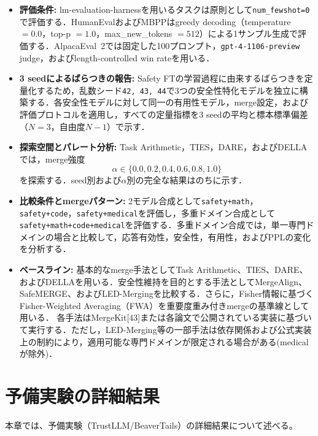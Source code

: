 \documentclass{article}
\begin{document}
\begin{itemize}
\begin{itemize}
        \item \textbf{評価条件:}
        lm-evaluation-harnessを用いるタスクは原則として\texttt{num\_fewshot=0}で評価する．HumanEvalおよびMBPPはgreedy decoding（temperature \(=0.0\)，top-p \(=1.0\)，max\_new\_tokens \(=512\)）による1サンプル生成で評価する．AlpacaEval~2では固定した100プロンプト，\texttt{gpt-4-1106-preview} judge，およびlength-controlled win rateを用いる．
        \item \textbf{3 seedによるばらつきの報告:}
        Safety FTの学習過程に由来するばらつきを定量化するため，乱数シード\texttt{42, 43, 44}で3つの安全性特化モデルを独立に構築する．各安全性モデルに対して同一の有用性モデル，merge設定，および評価プロトコルを適用し，すべての定量指標を3 seedの平均と標本標準偏差（\(N=3\)，自由度\(N-1\)）で示す．

        \item \textbf{探索空間とパレート分析:}
        Task Arithmetic，TIES，DARE，およびDELLAでは，merge強度
        \[
            \alpha \in \{0.0, 0.2, 0.4, 0.6, 0.8, 1.0\}
        \]
        を探索する．seed別および\(\alpha\)別の完全な結果はのちに示す．
        \item \textbf{比較条件とmergeパターン:}
        2モデル合成として\texttt{safety+math}，\texttt{safety+code}，\texttt{safety+medical}を評価し，多重ドメイン合成として\texttt{safety+math+code+medical}を評価する．多重ドメイン合成では，単一専門ドメインの場合と比較して，応答有効性，安全性，有用性，およびPPLの変化を分析する．
        \item \textbf{ベースライン:}
        基本的なmerge手法としてTask Arithmetic、TIES、DARE、およびDELLAを用いる．安全性維持を目的とする手法としてMergeAlign、SafeMERGE、およびLED-Mergingを比較する．さらに，Fisher情報に基づくFisher-Weighted Averaging（FWA）を重要度重み付きmergeの基準線として用いる．
        各手法はMergeKit[43]または各論文で公開されている実装に基づいて実行する．ただし，LED-Merging等の一部手法は依存関係および公式実装上の制約により，適用可能な専門ドメインが限定される場合がある(medicalが除外)．
    \end{itemize}
\end{itemize}

\section{予備実験の詳細結果}
\label{app:予備実験の詳細結果}
本章では、予備実験（TrustLLM/BeaverTails）の詳細結果について述べる。
\end{document}
